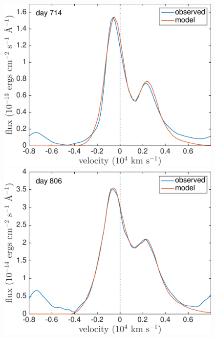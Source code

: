 \begin{figure}
\includegraphics[trim = 0 25 0 0,clip=true,scale=0.4]{chapters/chapter5/images/clump_1/maximum/d714OI_ext.pdf}
\hspace{1mm}
\includegraphics[trim =25 25 0 0,clip=true,scale=0.4]{chapters/chapter5/images/clump_1/maximum/d806OI_ext.pdf}


\end{figure}
